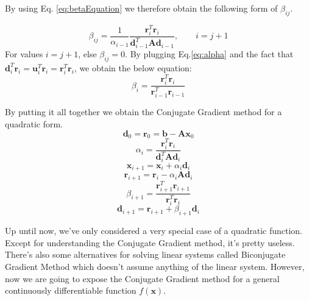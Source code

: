 \documentclass[a4paper,10pt]{article}
\theoremstyle{definition}
\begin{document}
By using Eq. \ref{eq:betaEquation} we therefore obtain the following form of $\beta_{ij}$.

\begin{equation}
	\beta_{ij} = \frac{1}{\alpha_{i-1}}\frac{\pmb{r}_i^T \pmb{r}_{i}}{\pmb{d}_{i-1}^T\pmb{A}\pmb{d}_{i-1}}, \qquad i = j + 1
	\label{eq:simplifiedBeta}
\end{equation}
For values $i = j + 1$, else $\beta_{ij} = 0$. By plugging Eq.\ref{eq:alpha} and the fact that \\ $\pmb{d}^T_i \pmb{r}_i = \pmb{u}_i^T\pmb{r}_i = \pmb{r}_i^T\pmb{r}_i$, we obtain the below equation:
\begin{equation}
	\beta_i = \frac{\pmb{r}_i^T\pmb{r}_i}{\pmb{r}_{i-1}^T\pmb{r}_{i-1}}
\end{equation}

By putting it all together we obtain the Conjugate Gradient method for a quadratic form.
\begin{equation}
	\pmb{d}_0 = \pmb{r}_0 = \pmb{b} - \pmb{A}\pmb{x}_0
	\label{eq:gradientStart}
\end{equation}
\begin{equation}
	\alpha_i = \frac{\pmb{r}_i^T \pmb{r}_i}{\pmb{d}^T_i\pmb{A}\pmb{d}_i}
	\label{eq:gradientAlpha}
\end{equation}
\begin{equation}
	\pmb{x}_{i+1} = \pmb{x}_i + \alpha_i \pmb{d}_i
	\label{eq:gradientX}
\end{equation}
\begin{equation}
	\pmb{r}_{i+1} = \pmb{r}_i - \alpha_i\pmb{A}\pmb{d}_i 
	\label{eq:gradientR}
\end{equation}
\begin{equation}
	\beta_{i+1} = \frac{\pmb{r}^T_{i+1}\pmb{r}_{i+1}}{\pmb{r}^T_i\pmb{r}_i}
	\label{eq:gradientBeta}
\end{equation}
\begin{equation}
	\pmb{d}_{i+1} = \pmb{r}_{i+1} + \beta_{i+1}\pmb{d}_i
	\label{eq:gradientD}
\end{equation}

Up until now, we've only considered a very special case of a quadratic function. Except for understanding the Conjugate Gradient method, it's pretty useless. There's also some alternatives for solving linear systems called Biconjugate Gradient Method which doesn't assume anything of the linear system. However, now we are going to expose the Conjugate Gradient method for a general continuously differentiable function $f(\pmb{x})$.\\
\end{document}
